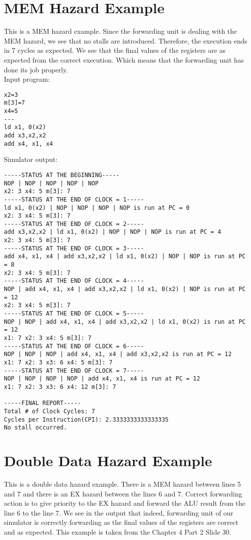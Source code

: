 \section{MEM Hazard Example}
This is a MEM hazard example. Since the forwarding unit is dealing with the MEM hazard, we see that no stalls are introduced. Therefore, the execution ends in 7 cycles as expected. We see that the final values of the registers are as expected from the correct execution. Which means that the forwarding unit has done its job properly.
\\

\noindent Input program:
\vspace{0.5 cm}
\begin{lstlisting}
x2=3
m[3]=7
x4=5
---
ld x1, 0(x2)
add x3,x2,x2
add x4, x1, x4
\end{lstlisting}
\vspace{0.5 cm}
Simulator output:
\vspace{0.5 cm}
\begin{lstlisting}
-----STATUS AT THE BEGINNING-----
NOP | NOP | NOP | NOP | NOP
x2: 3 x4: 5 m[3]: 7 
-----STATUS AT THE END OF CLOCK = 1-----
ld x1, 0(x2) | NOP | NOP | NOP | NOP is run at PC = 0
x2: 3 x4: 5 m[3]: 7 
-----STATUS AT THE END OF CLOCK = 2-----
add x3,x2,x2 | ld x1, 0(x2) | NOP | NOP | NOP is run at PC = 4
x2: 3 x4: 5 m[3]: 7 
-----STATUS AT THE END OF CLOCK = 3-----
add x4, x1, x4 | add x3,x2,x2 | ld x1, 0(x2) | NOP | NOP is run at PC = 8
x2: 3 x4: 5 m[3]: 7 
-----STATUS AT THE END OF CLOCK = 4-----
NOP | add x4, x1, x4 | add x3,x2,x2 | ld x1, 0(x2) | NOP is run at PC = 12
x2: 3 x4: 5 m[3]: 7 
-----STATUS AT THE END OF CLOCK = 5-----
NOP | NOP | add x4, x1, x4 | add x3,x2,x2 | ld x1, 0(x2) is run at PC = 12
x1: 7 x2: 3 x4: 5 m[3]: 7 
-----STATUS AT THE END OF CLOCK = 6-----
NOP | NOP | NOP | add x4, x1, x4 | add x3,x2,x2 is run at PC = 12
x1: 7 x2: 3 x3: 6 x4: 5 m[3]: 7 
-----STATUS AT THE END OF CLOCK = 7-----
NOP | NOP | NOP | NOP | add x4, x1, x4 is run at PC = 12
x1: 7 x2: 3 x3: 6 x4: 12 m[3]: 7 

-----FINAL REPORT-----
Total # of Clock Cycles: 7
Cycles per Instruction(CPI): 2.3333333333333335
No stall occurred.
\end{lstlisting}

\section{Double Data Hazard Example}
This is a double data hazard example. There is a MEM hazard between lines 5 and 7 and there is an EX hazard between the lines 6 and 7. Correct forwarding action is to give priority to the EX hazard and forward the ALU result from the line 6 to the line 7. We see in the output that indeed, forwarding unit of our simulator is correctly forwarding as the final values of the registers are correct and as expected. This example is taken from the Chapter 4 Part 2 Slide 30.
\\

